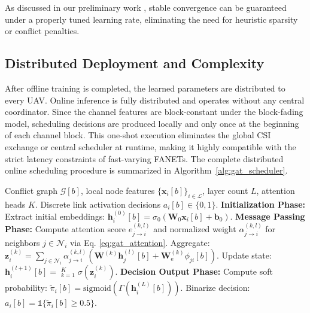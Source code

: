 \documentclass[letterpaper,journal]{IEEEtran}
\begin{document}
	As discussed in our preliminary work \cite{gatUAVconf}, stable convergence can be guaranteed under a properly tuned learning rate, eliminating the need for heuristic sparsity or conflict penalties.
	
	\subsection{Distributed Deployment and Complexity}
	\label{ssec:gat_execution}
	
	After offline training is completed, the learned parameters are distributed to every UAV. Online inference is fully distributed and operates without any central coordinator. Since the channel features are block-constant under the block-fading model, scheduling decisions are produced locally and only once at the beginning of each channel block. This one-shot execution eliminates the global CSI exchange or central scheduler at runtime, making it highly compatible with the strict latency constraints of fast-varying FANETs. The complete distributed online scheduling procedure is summarized in Algorithm~\ref{alg:gat_scheduler}.
	
\begin{algorithm}[tb]
	\caption{Distributed GAT-assisted Link Scheduling}
	\label{alg:gat_scheduler}
	\begin{algorithmic}[1]
		\REQUIRE Conflict graph $\mathcal{G}[b]$, local node features $\{\mathbf{x}_i[b]\}_{i\in\mathcal{L}}$, layer count $L$, attention heads $K$.
		\ENSURE Discrete link activation decisions $a_i[b] \in \{0, 1\}$.
		\STATE \textbf{Initialization Phase:} 
		\STATE Extract initial embeddings: $\mathbf{h}_i^{(0)}[b] = \sigma_0(\mathbf{W}_0\mathbf{x}_i[b]+\mathbf{b}_0)$.
		\STATE \textbf{Message Passing Phase:} 
		\STATE Compute attention score $e_{j \to i}^{(k, l)}$ and normalized weight $\alpha_{j \to i}^{(k, l)}$ for neighbors $j \in \mathcal{N}_i$ via Eq. \eqref{eq:gat_attention}.
		\STATE Aggregate: \\$\mathbf{z}_i^{(k)} = \sum_{j\in\mathcal{N}_i} \alpha_{j \to i}^{(k, l)} \left(\mathbf{W}^{(k)}\mathbf{h}_j^{(l)}[b] + \mathbf{W}_{\mathrm{e}}^{(k)}\phi_{ji}[b]\right)$.
		\ENDFOR
		\STATE Update state: $\mathbf{h}_i^{(l+1)}[b] = \mathop{\Big\Vert}_{k=1}^K \sigma(\mathbf{z}_i^{(k)})$.
		\ENDFOR
		\ENDFOR
		\STATE \textbf{Decision Output Phase:} 
		\STATE Compute soft probability: $\tilde{\pi}_i[b] = \mathrm{sigmoid}\left(\Gamma(\mathbf{h}_i^{(L)}[b])\right)$.
		\STATE Binarize decision: $a_i[b]=\mathds{1}\{\tilde{\pi}_i[b]\ge 0.5\}$.
		\ENDFOR
	\end{algorithmic}
\end{algorithm}
	
\end{document}
